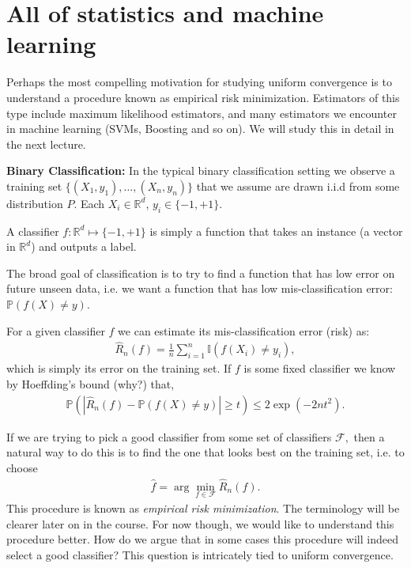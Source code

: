 \documentclass[twoside,12pt]{article}
\begin{document}
\section{All of statistics and machine learning}
Perhaps the most compelling motivation for studying uniform convergence is to understand a procedure known as empirical risk minimization. Estimators of this type include maximum likelihood estimators, and many estimators we encounter in machine learning (SVMs, Boosting and so on). We will study this in detail in the next lecture. 

{\bf Binary Classification: } In the typical binary classification setting we observe a training set $\{(X_1,y_1),\ldots,(X_n,y_n)\}$ that we assume are drawn i.i.d from some distribution $P$. Each $X_i \in \mathbb{R}^d$, $y_i \in \{-1,+1\}$.

A classifier $f: \mathbb{R}^d \mapsto \{-1,+1\}$ is simply a function that takes an instance (a vector in $\mathbb{R}^d$) and outputs a label.

The broad goal of classification is to try to find a function that has low error on future unseen data, i.e. we want a function that has low mis-classification error: $\mathbb{P}(f(X) \neq y)$.

For a given classifier $f$ we can estimate its mis-classification error (risk) as:
\begin{align*}
\widehat{R}_n(f) = \frac{1}{n} \sum_{i=1}^n \mathbb{I}(f(X_i) \neq y_i), 
\end{align*}
which is simply its error on the training set. If $f$ is some fixed classifier we know by Hoeffding's bound (why?) that,
\begin{align*}
\mathbb{P}( | \widehat{R}_n(f) - \mathbb{P}(f(X) \neq y)| \geq t) \leq 2 \exp(-2 n t^2).
\end{align*}

If we are trying to pick a good classifier from some set of classifiers $\mathcal{F},$ then a natural way to do this is to find the one that looks best on the training set, i.e. to choose
\begin{align*}
\widehat{f} = \arg \min_{f \in \mathcal{F}} \widehat{R}_n(f).
\end{align*}
This procedure is known as \emph{empirical risk minimization}. The terminology will be clearer later on in the course. For now though, we would like to understand this procedure better. How do we argue that in some cases this procedure will indeed select a good classifier? This question is intricately tied to uniform convergence.
\end{document}

